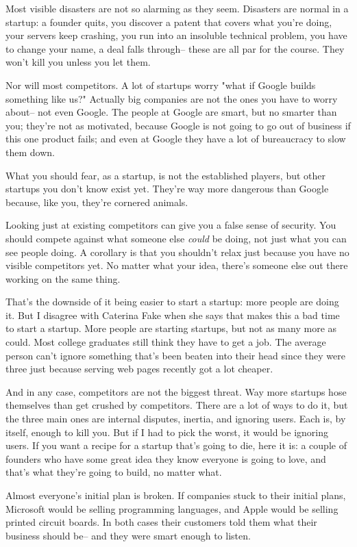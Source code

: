 Most visible disasters are not so alarming as they seem.  Disasters
are normal in a startup: a founder quits, you discover a patent
that covers what you're doing, your servers keep crashing, you run
into an insoluble technical problem, you have to change your name,
a deal falls through-- these are all par for the course.  They won't
kill you unless you let them.

Nor will most competitors.  A lot of startups worry "what if Google
builds something like us?"  Actually big companies are not the ones
you have to worry about-- not even Google.  The people at Google
are smart, but no smarter than you; they're not as motivated, because
Google is not going to go out of business if this one product fails;
and even at Google they have a lot of bureaucracy to slow them down.

What you should fear, as a startup, is not the established players,
but other startups you don't know exist yet.  They're way more
dangerous than Google because, like you, they're cornered animals.

Looking just at existing competitors can give you a false sense of
security.  You should compete against what someone else \emph{could} be
doing, not just what you can see people doing.  A corollary is that
you shouldn't relax just because you have no visible competitors
yet.  No matter what your idea, there's someone else out there
working on the same thing.

That's the downside of it being easier to start a startup: more people
are doing it.  But I disagree with Caterina Fake when she says that
makes this a bad time to start a startup.  More people are starting
startups, but not as many more as could.  Most college graduates
still think they have to get a job.  The average person can't ignore
something that's been beaten into their head since they were three
just because serving web pages recently got a lot cheaper.

And in any case, competitors are not the biggest threat.  Way more
startups hose themselves than get crushed by competitors.  There
are a lot of ways to do it, but the three main ones are internal
disputes, inertia, and ignoring users.  Each is, by itself, enough
to kill you.  But if I had to pick the worst, it would be ignoring
users.  If you want a recipe for a startup that's going to die,
here it is: a couple of founders who have some great idea they know
everyone is going to love, and that's what they're going to build,
no matter what.

Almost everyone's initial plan is broken.  If companies stuck to
their initial plans, Microsoft would be selling programming languages,
and Apple would be selling printed circuit boards.  In both cases
their customers told them what their business should be-- and they
were smart enough to listen.

